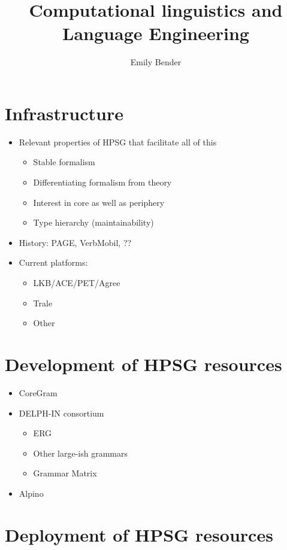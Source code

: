 \documentclass[output=paper]{langsci/langscibook}
\author{%
	Emily Bender\affiliation{University of Washington}
}
\title{Computational linguistics and Language Engineering}
\begin{document}
\section{Infrastructure}

\begin{itemize}
\item Relevant properties of HPSG that facilitate all of this
    \begin{itemize}
    \item Stable formalism
    \item Differentiating formalism from theory
    \item Interest in core as well as periphery
    \item Type hierarchy (maintainability)
    \end{itemize}
\item History: PAGE, VerbMobil, ??
\item Current platforms:
    \begin{itemize}
    \item LKB/ACE/PET/Agree
    \item Trale
    \item Other
    \end{itemize}
\end{itemize}

\section{Development of HPSG resources}


\begin{itemize}
 \item  CoreGram
 \item  DELPH-IN consortium
    \begin{itemize}
    \item ERG
    \item Other large-ish grammars
    \item Grammar Matrix
    \end{itemize}
 \item Alpino
\end{itemize}

\section{Deployment of HPSG resources}
\end{document}
